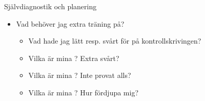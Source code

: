 %
%
%

\begin{Slide}{Självdiagnostik och planering}
\begin{itemize}
\item Vad behöver jag extra träning på?
\begin{itemize}
\item Vad hade jag lätt resp. svårt för på kontrollskrivingen?
\item Vilka är mina ? Extra svårt?
\item Vilka är mina ? Inte provat alls?
\item Vilka är mina ? Hur fördjupa mig?
\end{itemize}
\end{itemize}
\end{Slide}



